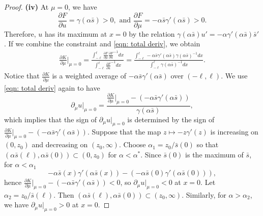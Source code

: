\documentclass[10pt,a4paper]{amsart}
\begin{document}
\begin{proof}
\textbf{(iv)}  At $\mu=0$, we have 
\begin{equation*}
    \frac{\partial F}{\partial u}  = \gamma(\alpha \bar s)>0, \text{ and } \frac{\partial F}{\partial \mu}  = -\alpha\bar s\gamma'(\alpha\bar s)>0.
\end{equation*} Therefore, $u$ has its maximum at $x=0$ by the relation $\gamma(\alpha\bar s)u' = -\alpha\gamma'(\alpha \bar s)\bar s'$.  
If we combine the constraint and \eqref{eqn: total deriv}, we obtain 
\begin{align*}
    \frac{\partial K}{\partial \mu} \Big|_{{\mu=0}} = \frac{\int_{-\ell}^{\ell}\frac{\partial F}{\partial \mu}  \frac{\partial F}{\partial u} ^{-1}dx}{\int_{-\ell}^{\ell}\frac{\partial F}{\partial u} ^{-1}dx} =\frac{\int_{-\ell}^{\ell}-\alpha\bar s\gamma'(\alpha\bar s) \gamma(\alpha \bar s)^{-1}dx}{\int_{-\ell}^{\ell}\gamma(\alpha \bar s)^{-1}dx}.
\end{align*} Notice that $\frac{\partial K}{\partial \mu} $ is a weighted average of $-\alpha\bar s \gamma'(\alpha \bar s)$ over $(-\ell,\ell)$. We use \eqref{eqn: total deriv} again to have
\begin{equation*}
    \partial_\mu u\Big|_{\mu=0} = \frac{\frac{\partial K}{\partial \mu} \big|_{\mu=0} -(-\alpha\bar s\gamma'(\alpha\bar s))}{\gamma(\alpha\bar s)},
\end{equation*} which implies that the sign of $\partial_\mu u\big|_{\mu=0}$ is determined by the sign of $\frac{\partial K}{\partial \mu} \big|_{\mu=0} -(-\alpha\bar s\gamma'(\alpha\bar s))$. Suppose that the map $z\mapsto -z\gamma'(z)$ is increasing on $(0,z_0)$ and decreasing on $(z_0,\infty)$. Choose $\alpha_1 = z_0/\bar s(0)$ so that  $(\alpha\bar s(\ell),\alpha\bar  s(0))\subset (0,z_0)$ for $\alpha<\alpha^*$. Since $\bar s(0)$ is the maximum of $\bar s$, for $\alpha<\alpha_1$
\begin{equation*}
    -\alpha\bar s(x)\gamma'(\alpha\bar s(x)) - (-\alpha\bar s(0)\gamma'(\alpha\bar s(0))),
\end{equation*} hence $\frac{\partial K}{\partial \mu} \big|_{\mu=0} -(-\alpha\bar s\gamma'(\alpha\bar s))<0$, so $\partial_\mu u\big|_{\mu=0}<0$ at $x=0$. Let $\alpha_2 = z_0/\bar s(\ell)$. Then $(\alpha \bar s (\ell),\alpha \bar s (0))\subset (z_0,\infty)$. Similarly, for $\alpha>\alpha_2$, we have $\partial_\mu u\big|_{\mu=0}>0$ at $x=0$.

\end{proof}
\end{document}
